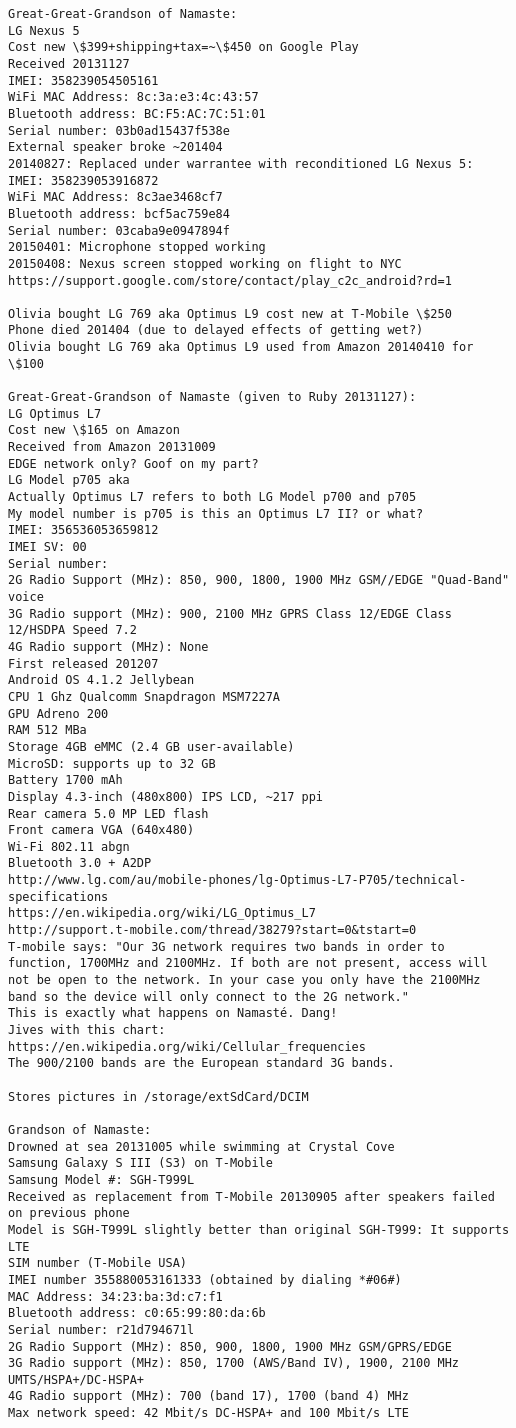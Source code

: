 \documentclass[12pt,twoside]{article}
\begin{document}
\begin{verbatim}
Great-Great-Grandson of Namaste:
LG Nexus 5
Cost new \$399+shipping+tax=~\$450 on Google Play
Received 20131127
IMEI: 358239054505161
WiFi MAC Address: 8c:3a:e3:4c:43:57
Bluetooth address: BC:F5:AC:7C:51:01
Serial number: 03b0ad15437f538e
External speaker broke ~201404
20140827: Replaced under warrantee with reconditioned LG Nexus 5:
IMEI: 358239053916872
WiFi MAC Address: 8c3ae3468cf7
Bluetooth address: bcf5ac759e84
Serial number: 03caba9e0947894f
20150401: Microphone stopped working
20150408: Nexus screen stopped working on flight to NYC
https://support.google.com/store/contact/play_c2c_android?rd=1

Olivia bought LG 769 aka Optimus L9 cost new at T-Mobile \$250
Phone died 201404 (due to delayed effects of getting wet?)
Olivia bought LG 769 aka Optimus L9 used from Amazon 20140410 for \$100

Great-Great-Grandson of Namaste (given to Ruby 20131127):
LG Optimus L7
Cost new \$165 on Amazon
Received from Amazon 20131009
EDGE network only? Goof on my part?
LG Model p705 aka 
Actually Optimus L7 refers to both LG Model p700 and p705
My model number is p705 is this an Optimus L7 II? or what?
IMEI: 356536053659812
IMEI SV: 00
Serial number: 
2G Radio Support (MHz): 850, 900, 1800, 1900 MHz GSM//EDGE "Quad-Band" voice
3G Radio support (MHz): 900, 2100 MHz GPRS Class 12/EDGE Class 12/HSDPA Speed 7.2
4G Radio support (MHz): None
First released 201207
Android OS 4.1.2 Jellybean
CPU 1 Ghz Qualcomm Snapdragon MSM7227A
GPU Adreno 200
RAM 512 MBa
Storage 4GB eMMC (2.4 GB user-available)
MicroSD: supports up to 32 GB
Battery 1700 mAh
Display 4.3-inch (480x800) IPS LCD, ~217 ppi
Rear camera 5.0 MP LED flash
Front camera VGA (640x480)
Wi-Fi 802.11 abgn
Bluetooth 3.0 + A2DP
http://www.lg.com/au/mobile-phones/lg-Optimus-L7-P705/technical-specifications
https://en.wikipedia.org/wiki/LG_Optimus_L7
http://support.t-mobile.com/thread/38279?start=0&tstart=0
T-mobile says: "Our 3G network requires two bands in order to
function, 1700MHz and 2100MHz. If both are not present, access will
not be open to the network. In your case you only have the 2100MHz
band so the device will only connect to the 2G network."
This is exactly what happens on Namasté. Dang!
Jives with this chart: https://en.wikipedia.org/wiki/Cellular_frequencies
The 900/2100 bands are the European standard 3G bands. 

Stores pictures in /storage/extSdCard/DCIM

Grandson of Namaste:
Drowned at sea 20131005 while swimming at Crystal Cove
Samsung Galaxy S III (S3) on T-Mobile
Samsung Model #: SGH-T999L
Received as replacement from T-Mobile 20130905 after speakers failed on previous phone
Model is SGH-T999L slightly better than original SGH-T999: It supports LTE
SIM number (T-Mobile USA) 
IMEI number 355880053161333 (obtained by dialing *#06#)
MAC Address: 34:23:ba:3d:c7:f1
Bluetooth address: c0:65:99:80:da:6b
Serial number: r21d794671l
2G Radio Support (MHz): 850, 900, 1800, 1900 MHz GSM/GPRS/EDGE
3G Radio support (MHz): 850, 1700 (AWS/Band IV), 1900, 2100 MHz UMTS/HSPA+/DC-HSPA+
4G Radio support (MHz): 700 (band 17), 1700 (band 4) MHz
Max network speed: 42 Mbit/s DC-HSPA+ and 100 Mbit/s LTE


\end{verbatim}
\end{document}
